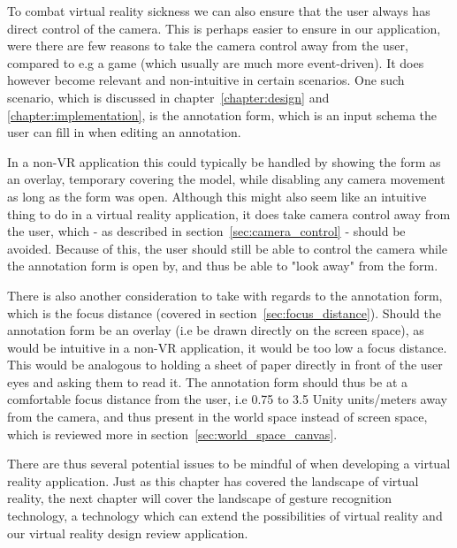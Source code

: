 To combat virtual reality sickness we can also ensure that the user always has direct control of the camera. 
This is perhaps easier to ensure in our application, were there are few reasons to take the camera control away from the user, 
compared to e.g a game (which usually are much more event-driven). It does however become relevant and non-intuitive in certain scenarios.  
One such scenario, which is discussed in chapter~\ref{chapter:design} and \ref{chapter:implementation}, is the annotation form, which is an input schema the user can fill in
when editing an annotation. 

In a non-VR application this could typically be handled by showing the form as an overlay, temporary covering the model, while disabling any camera movement as long as the
form was open. Although this might also seem like an intuitive thing to do in a virtual reality application, it does take camera control away from the user, which - as described in
section~\vref{sec:camera_control} - should be avoided. Because of this,
the user should still be able to control the camera while the annotation form is open by, and thus be able to "look away" from the form. 

There is also another consideration to take with regards to the annotation form, which is the focus distance (covered in section~\vref{sec:focus_distance}). 
Should the annotation form be an overlay (i.e be drawn directly on the screen space), as would be intuitive in a non-VR application, 
it would be too low a focus distance. This would be analogous to holding a sheet of paper directly in front
of the user eyes and asking them to read it. The annotation form should thus be at a comfortable focus distance from the user, i.e 0.75 to 3.5 Unity units/meters away 
from the camera, and thus present in the world space instead of screen space, which is reviewed more in section~\vref{sec:world_space_canvas}. 

There are thus several potential issues to be mindful of when developing a virtual reality application. Just as this chapter 
has covered the landscape of virtual reality, the next chapter will cover the landscape of gesture recognition technology, a technology which can extend the possibilities
of virtual reality and our virtual reality design review application.